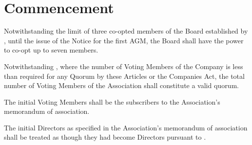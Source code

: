 \documentclass[10pt]{mk-articles-of-association}
\newcommand{\EC}[0]{Board}
\newcommand{\Exec}[0]{\EC{} }
\begin{document}


\section{Commencement}

\begin{constenum}
  \item Notwithstanding the limit of three co-opted members of the
    \Exec established by , until the issue of
    the Notice for the first AGM, the \Exec shall have the power to
    co-opt up to seven members.

  \item Notwithstanding , where the number of
    Voting Members of the Company is less than required for any Quorum
    by these Articles or the Companies Act, the total number of Voting
    Members of the Association shall constitute a valid quorum.

  \item The initial Voting Members shall
    be the subscribers to the Association’s memorandum of association.

  \item The initial Directors as specified in the Association’s
    memorandum of association shall be treated as though they had
    become Directors pursuant to .

\end{constenum}
\end{document}
